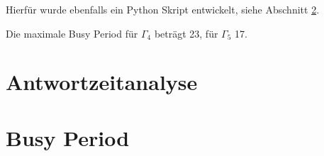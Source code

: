 \documentclass[DIN, pagenumber=false, fontsize=11pt, parskip=half]{scrartcl}
\begin{document}
    Hierfür wurde ebenfalls ein Python Skript entwickelt, siehe Abschnitt \ref{sec:app:busy}.

    Die maximale Busy Period für $\Gamma_4$ beträgt 23, für $\Gamma_5$ 17.

    \appendix
    \section{Antwortzeitanalyse} \label{sec:app:response}
    

    \section{Busy Period} \label{sec:app:busy}
    
\end{document}
